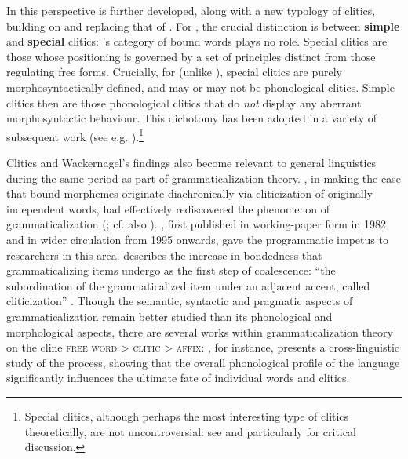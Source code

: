 \documentclass[output=paper]{../langscibook}
\begin{document}
In \citet{Anderson2005} this perspective is further developed, along with a new typology of clitics, building on and replacing that of \citet{Zwicky1977}. For \citeauthor{Anderson2005}, the crucial distinction is between \textbf{simple} and \textbf{special} clitics: \citeauthor{Zwicky1977}'s category of bound words plays no role. Special clitics are those whose positioning is governed by a set of principles distinct from those regulating free forms. Crucially, for \citeauthor{Anderson2005} (unlike \citeauthor{Zwicky1977}), special clitics are purely morphosyntactically defined, and may or may not be phonological clitics. Simple clitics then are those phonological clitics that do \emph{not} display any aberrant morphosyntactic behaviour. This dichotomy has been adopted in a variety of subsequent work (see e.g. \citealp[95]{Boegel2015}).\footnote{Special clitics, although perhaps the most interesting type of clitics theoretically, are not uncontroversial: see \citet{SpencerLuis2012} and particularly \citet{BermudezOteroPayne2011} for critical discussion.}

Clitics and Wackernagel's findings also become relevant to general linguistics during the same period as part of grammaticalization theory. \citet{Givon1971}, in making the case that bound morphemes originate diachronically via cliticization of originally independent words, had effectively rediscovered the phenomenon of grammaticalization (\citealp{Meillet1912}; cf. also \citealp{Kurylowicz1965}). \citet{Lehmann2015}, first published in working-paper form in 1982 and in wider circulation from 1995 onwards, gave the programmatic impetus to researchers in this area. \citeauthor{Lehmann2015} describes the increase in bondedness that grammaticalizing items undergo as the first step of coalescence: ``the subordination of the grammaticalized item under an adjacent accent, called cliticization'' \citep[157]{Lehmann2015}. Though the semantic, syntactic and pragmatic aspects of grammaticalization remain better studied than its phonological and morphological aspects, there are several works within grammaticalization theory on the cline \textsc{free word} > \textsc{clitic} > \textsc{affix}: \citet{Schiering2006,Schiering2010}, for instance, presents a cross-linguistic study of the process, showing that the overall phonological profile of the language significantly influences the ultimate fate of individual words and clitics.
\end{document}
